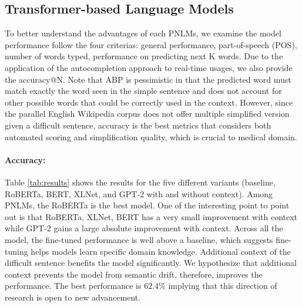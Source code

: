 \documentclass[11pt]{article}
\newcommand{\todo}[1]{\textcolor{red}{TODO: #1}}
\begin{document}
\subsection{Transformer-based Language Models}

To better understand the advantages of each PNLMs, we examine the model performance follow the four criterias: general performance, part-of-speech (POS), number of words typed, performance on predicting next K words. Due to the application of the autocompletion approach to real-time usages, we also provide the accuracy@N. Note that ABP is pessimistic in that the predicted word must match exactly the word seen in the simple sentence and does not account for other possible words that could be correctly used in the context. However, since the parallel English Wikipedia corpus does not offer multiple simplified version given a difficult sentence, accuracy is the best metrics that considers both automated scoring and simplification quality, which is crucial to medical domain. 

\paragraph{Accuracy:} Table \ref{tab:results} shows the results for the five different variants (baseline, RoBERTa, BERT, XLNet, and GPT-2 with and without context). Among PNLMs, the RoBERTa is the best model. One of the interesting point to point out is that RoBERTa, XLNet, BERT has a very small improvement with context while GPT-2 gains a large absolute improvement with context. Across all the model, the fine-tuned performance is well above a baseline, which suggests fine-tuning helps models learn specific domain knowledge. Additional context of the difficult sentence benefits the model significantly. We hypothesize that additional context prevents the model from semantic drift, therefore, improves the performance. The best performance is $62.4\%$ implying that this direction of research is open to new advancement.

\begin{table}[t]
\centering
{}
\caption{Accuracy for the different models on the Wikipedia test corpus of 450 \todo{AHMAD: check this if the number is same as yours} sentence pairs.  Context-aware approaches included the context of the difficult sentence when predicting.} 
\label{tab:results}
\end{table}
\end{document}
